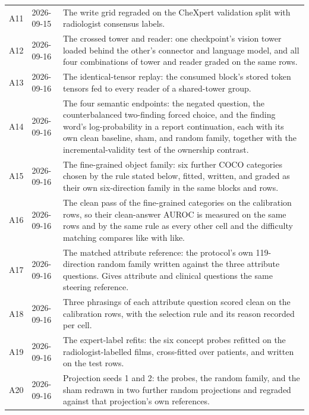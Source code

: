 \documentclass{article}
\begin{document}
\begin{table}[h]
{\begin{tabular}{ll>{\raggedright\arraybackslash}p{}}
A11 & 2026-09-15 & The write grid regraded on the CheXpert validation split with radiologist consensus labels. \\
A12 & 2026-09-16 & The crossed tower and reader: one checkpoint's vision tower loaded behind the other's connector and language model, and all four combinations of tower and reader graded on the same rows. \\
A13 & 2026-09-16 & The identical-tensor replay: the consumed block's stored token tensors fed to every reader of a shared-tower group. \\
A14 & 2026-09-16 & The four semantic endpoints: the negated question, the counterbalanced two-finding forced choice, and the finding word's log-probability in a report continuation, each with its own clean baseline, sham, and random family, together with the incremental-validity test of the ownership contrast. \\
A15 & 2026-09-16 & The fine-grained object family: six further COCO categories chosen by the rule stated below, fitted, written, and graded as their own six-direction family in the same blocks and rows. \\
A16 & 2026-09-16 & The clean pass of the fine-grained categories on the calibration rows, so their clean-answer AUROC is measured on the same rows and by the same rule as every other cell and the difficulty matching compares like with like. \\
A17 & 2026-09-16 & The matched attribute reference: the protocol's own 119-direction random family written against the three attribute questions. Gives attribute and clinical questions the same steering reference. \\
A18 & 2026-09-16 & Three phrasings of each attribute question scored clean on the calibration rows, with the selection rule and its reason recorded per cell. \\
A19 & 2026-09-16 & The expert-label refits: the six concept probes refitted on the radiologist-labelled films, cross-fitted over patients, and written on the test rows. \\
A20 & 2026-09-16 & Projection seeds 1 and 2: the probes, the random family, and the sham redrawn in two further random projections and regraded against that projection's own references. \\
\bottomrule
\end{tabular}}
\end{table}

\FloatBarrier
\end{document}
